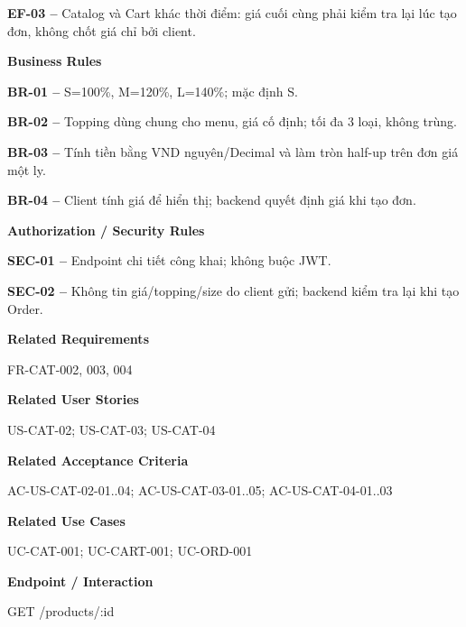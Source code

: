 \documentclass[11pt,a4paper,oneside]{report}
\begin{document}
\textbf{EF-03 --} Catalog và Cart khác thời điểm: giá cuối cùng phải kiểm tra lại lúc tạo đơn, không chốt giá chỉ bởi client.
\par

\par\smallskip\noindent\textcolor{sgublue}{\textbf{Business Rules}}\par\nobreak
\textbf{BR-01 --} S=100\%, M=120\%, L=140\%; mặc định S.

\textbf{BR-02 --} Topping dùng chung cho menu, giá cố định; tối đa 3 loại, không trùng.

\textbf{BR-03 --} Tính tiền bằng VND nguyên/Decimal và làm tròn half-up trên đơn giá một ly.

\textbf{BR-04 --} Client tính giá để hiển thị; backend quyết định giá khi tạo đơn.
\par

\par\smallskip\noindent\textcolor{sgublue}{\textbf{Authorization / Security Rules}}\par\nobreak
\textbf{SEC-01 --} Endpoint chi tiết công khai; không buộc JWT.

\textbf{SEC-02 --} Không tin giá/topping/size do client gửi; backend kiểm tra lại khi tạo Order.
\par

\par\smallskip\noindent\textcolor{sgublue}{\textbf{Related Requirements}}\par\nobreak
FR-CAT-002, 003, 004
\par

\par\smallskip\noindent\textcolor{sgublue}{\textbf{Related User Stories}}\par\nobreak
US-CAT-02; US-CAT-03; US-CAT-04
\par

\par\smallskip\noindent\textcolor{sgublue}{\textbf{Related Acceptance Criteria}}\par\nobreak
AC-US-CAT-02-01..04; AC-US-CAT-03-01..05; AC-US-CAT-04-01..03
\par

\par\smallskip\noindent\textcolor{sgublue}{\textbf{Related Use Cases}}\par\nobreak
UC-CAT-001; UC-CART-001; UC-ORD-001
\par

\par\smallskip\noindent\textcolor{sgublue}{\textbf{Endpoint / Interaction}}\par\nobreak
GET /products/:id
\par
\end{document}
